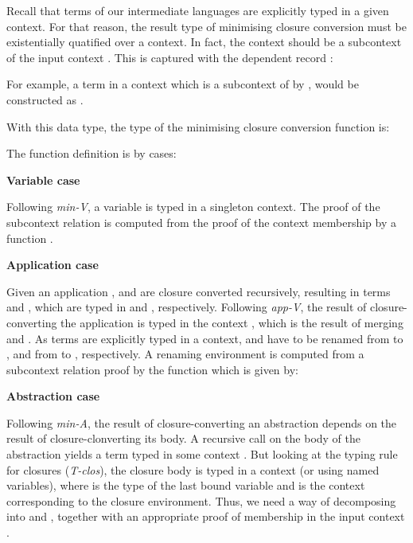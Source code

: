 \documentclass[bsc,frontabs,oneside,singlespacing,parskip,deptreport]{infthesis}
\theoremstyle{definition}
\begin{document}
Recall that terms of our intermediate languages are explicitly typed
in a given context. For that reason, the result type of minimising
closure conversion must be existentially quatified over a
context. In fact, the context should be a subcontext of the input
context . This is captured with the dependent record
:


For example, a term  in a context  which is a subcontext
of  by , would be constructed as .

With this data type, the type of the minimising closure conversion
function is:


The function definition is by cases:

\textbf{Variable case}


Following \textit{min-V}, a variable is typed in a singleton
context. The proof of the subcontext relation is computed from the
proof of the context membership by a function .

\textbf{Application case}


Given an application ,  and  are closure
converted recursively, resulting in terms  and , which
are typed in  and , respectively. Following
\textit{app-V}, the result of closure-converting the application is
typed in the context , which is the result of merging 
and . As terms are explicitly typed in a context,  and
 have to be renamed from  to , and from 
to , respectively. A renaming environment is computed from a
subcontext relation proof by the function  which is given by:


\textbf{Abstraction case}


Following \textit{min-A}, the result of closure-converting an
abstraction depends on the result  of closure-clonverting its
body. A recursive call on the body of the abstraction yields a term
typed in some context . But looking at the typing rule for
closures (\textit{T-clos}), the closure body is typed in a context
 (or  using named variables), where  is
the type of the last bound variable and  is the context
corresponding to the closure environment. Thus, we need a way of
decomposing  into  and , together with an
appropriate proof of membership in the input context .
\end{document}
